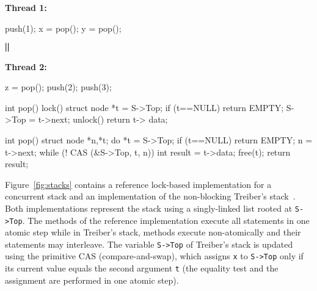 \begin{figure*}[t]
\begin{minipage}{5cm}
\begin{minipage}{1.8cm}
\bigskip
{\bf Thread 1:}
\vspace{-1mm}
\begin{program}
push(1);
x = pop();
y = pop();
\end{program}
\end{minipage}
\begin{minipage}{.5cm}
\vspace{6mm}
{\large $\bigparallel$}
\end{minipage}
\begin{minipage}{2cm}
\bigskip
{\bf Thread 2:}
\vspace{-1mm}
\begin{program}
z = pop();
push(2);
push(3);
\end{program}
\end{minipage}
\end{minipage}
\begin{minipage}{6.5cm}
\lstset{firstnumber=10}
\begin{program}
int pop() {
	lock()
	struct node *t = S->Top;
	if (t==NULL)
		return EMPTY;
	S->Top = t->next;
	unlock()
	return t-> data;
}
\end{program}
\end{minipage}
\begin{minipage}{6cm}
\lstset{firstnumber=10}
\begin{program}
int pop() {
	struct node *n,*t;
	do {
		*t = S->Top;
		if (t==NULL)
			return EMPTY;
		n = t->next;
	} while (! CAS (&S->Top, t, n))
	int result = t->data;
	free(t);
	return result;
}

\end{program}
\end{minipage}
\caption{A reference lock-based implementation of a concurrent stack and Treiber's stack implementation. The client program $P$ consists of two concurrent threads executing the statements in the left and respectively, the right of the $\parallel$ symbol.}
\label{fig:stacks}
\end{figure*}

Figure~\ref{fig:stacks} contains a reference lock-based implementation for a concurrent stack and an implementation of the non-blocking Treiber's stack~\cite{Treiber'86}. Both implementations represent the stack using a singly-linked list rooted at {\tt S->Top}. The methods of the reference implementation execute all statements in one atomic step while in Treiber's stack, methods execute non-atomically and their statements may interleave. The variable {\tt S->Top} of Treiber's stack is updated using the primitive CAS (compare-and-swap), which assigns {\tt x} to {\tt S->Top} only if its current value equals the second argument {\tt t} (the equality test and the assignment are performed in one atomic step).

